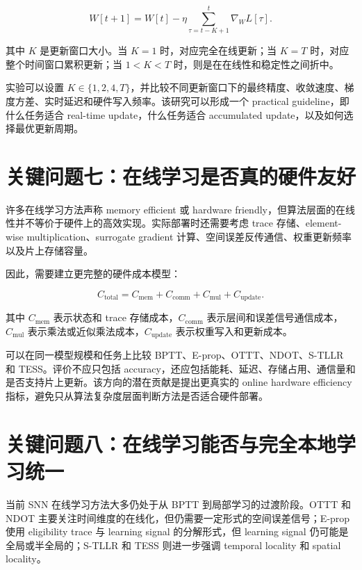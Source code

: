 \documentclass[11pt]{ctexart}
\begin{document}
\begin{equation}
W[t+1]
=
W[t]
-
\eta
\sum_{\tau=t-K+1}^{t}
\nabla_W L[\tau].
\end{equation}

其中 $K$ 是更新窗口大小。当 $K=1$ 时，对应完全在线更新；当 $K=T$ 时，对应整个时间窗口累积更新；当 $1<K<T$ 时，则是在在线性和稳定性之间折中。

实验可以设置 $K\in\{1,2,4,T\}$，并比较不同更新窗口下的最终精度、收敛速度、梯度方差、实时延迟和硬件写入频率。该研究可以形成一个 practical guideline，即什么任务适合 real-time update，什么任务适合 accumulated update，以及如何选择最优更新周期。

\section{关键问题七：在线学习是否真的硬件友好}

许多在线学习方法声称 memory efficient 或 hardware friendly，但算法层面的在线性并不等价于硬件上的高效实现。实际部署时还需要考虑 trace 存储、element-wise multiplication、surrogate gradient 计算、空间误差反传通信、权重更新频率以及片上存储容量。

因此，需要建立更完整的硬件成本模型：

\begin{equation}
C_{\mathrm{total}}
=
C_{\mathrm{mem}}
+
C_{\mathrm{comm}}
+
C_{\mathrm{mul}}
+
C_{\mathrm{update}}.
\end{equation}

其中 $C_{\mathrm{mem}}$ 表示状态和 trace 存储成本，$C_{\mathrm{comm}}$ 表示层间和误差信号通信成本，$C_{\mathrm{mul}}$ 表示乘法或近似乘法成本，$C_{\mathrm{update}}$ 表示权重写入和更新成本。

可以在同一模型规模和任务上比较 BPTT、E-prop、OTTT、NDOT、S-TLLR 和 TESS。评价不应只包括 accuracy，还应包括能耗、延迟、存储占用、通信量和是否支持片上更新。该方向的潜在贡献是提出更真实的 online hardware efficiency 指标，避免只从算法复杂度层面判断方法是否适合硬件部署。

\section{关键问题八：在线学习能否与完全本地学习统一}

当前 SNN 在线学习方法大多仍处于从 BPTT 到局部学习的过渡阶段。OTTT 和 NDOT 主要关注时间维度的在线化，但仍需要一定形式的空间误差信号；E-prop 使用 eligibility trace 与 learning signal 的分解形式，但 learning signal 仍可能是全局或半全局的；S-TLLR 和 TESS 则进一步强调 temporal locality 和 spatial locality。
\end{document}
